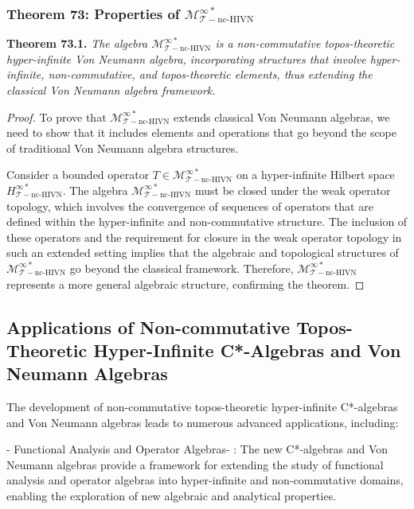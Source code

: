 \documentclass{article}
\begin{document}
\subsubsection{Theorem 73: Properties of \(\mathcal{M}_{\mathcal{T}-\text{nc-HIVN}}^{\infty *}\)}
\textbf{Theorem 73.1.} \textit{The algebra \(\mathcal{M}_{\mathcal{T}-\text{nc-HIVN}}^{\infty *}\) is a non-commutative topos-theoretic hyper-infinite Von Neumann algebra, incorporating structures that involve hyper-infinite, non-commutative, and topos-theoretic elements, thus extending the classical Von Neumann algebra framework.}

\begin{proof}
To prove that \(\mathcal{M}_{\mathcal{T}-\text{nc-HIVN}}^{\infty *}\) extends classical Von Neumann algebras, we need to show that it includes elements and operations that go beyond the scope of traditional Von Neumann algebra structures.

Consider a bounded operator \(T \in \mathcal{M}_{\mathcal{T}-\text{nc-HIVN}}^{\infty *}\) on a hyper-infinite Hilbert space \(H_{\mathcal{T}-\text{nc-HIVN}}^{\infty *}\). The algebra \(\mathcal{M}_{\mathcal{T}-\text{nc-HIVN}}^{\infty *}\) must be closed under the weak operator topology, which involves the convergence of sequences of operators that are defined within the hyper-infinite and non-commutative structure. The inclusion of these operators and the requirement for closure in the weak operator topology in such an extended setting implies that the algebraic and topological structures of \(\mathcal{M}_{\mathcal{T}-\text{nc-HIVN}}^{\infty *}\) go beyond the classical framework. Therefore, \(\mathcal{M}_{\mathcal{T}-\text{nc-HIVN}}^{\infty *}\) represents a more general algebraic structure, confirming the theorem.
\end{proof}

\subsection{Applications of Non-commutative Topos-Theoretic Hyper-Infinite C*-Algebras and Von Neumann Algebras}
The development of non-commutative topos-theoretic hyper-infinite C*-algebras and Von Neumann algebras leads to numerous advanced applications, including:

-  Functional Analysis and Operator Algebras- : The new C*-algebras and Von Neumann algebras provide a framework for extending the study of functional analysis and operator algebras into hyper-infinite and non-commutative domains, enabling the exploration of new algebraic and analytical properties.
\end{document}
